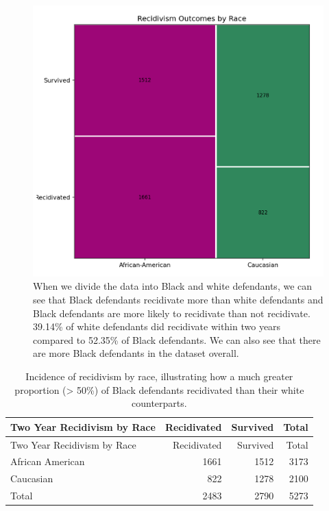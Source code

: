 \documentclass[water,article,submit,moreauthors,pdftex]{mdpi}
\begin{document}
\begin{figure}

{\centering \includegraphics[width=1\linewidth]{../images/recidivism_mosaic} 

}

\caption{When we divide the data into Black and white defendants, we can see that Black defendants recidivate more than white defendants and Black defendants are more likely to recidivate than not recidivate. 39.14\% of white defendants did recidivate within two years compared to 52.35\% of Black defendants. We can also see that there are more Black defendants in the dataset overall.}\label{fig:recidivism mosaic}
\end{figure}

\begin{longtable}[]{@{}lrrr@{}}
\caption{Incidence of recidivism by race, illustrating how a much
greater proportion (\textgreater{} 50\%) of Black defendants recidivated
than their white counterparts. \label{tab:recid table}}\tabularnewline
\toprule
Two Year Recidivism by Race & Recidivated & Survived & Total \\
\midrule
\endfirsthead
\toprule
Two Year Recidivism by Race & Recidivated & Survived & Total \\
\midrule
\endhead
African American & 1661 & 1512 & 3173 \\
Caucasian & 822 & 1278 & 2100 \\
Total & 2483 & 2790 & 5273 \\
\bottomrule
\end{longtable}
\end{document}
